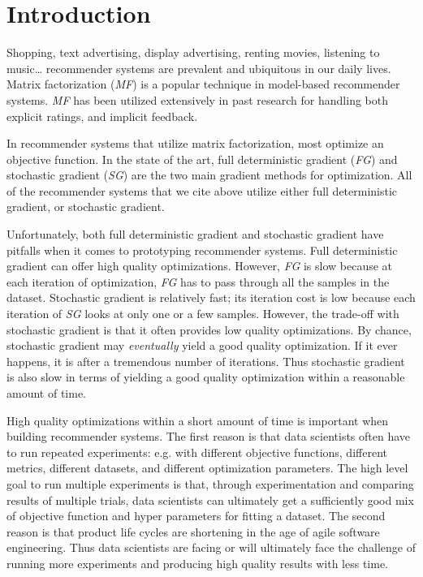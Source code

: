 \section{Introduction}
Shopping, text advertising, display advertising, renting movies, listening to music… recommender systems are prevalent and ubiquitous in our daily lives.  
Matrix factorization (\emph{MF}) is a popular technique in model-based recommender systems.  
\emph{MF} has been utilized extensively in past research for handling both explicit \cite{mmmf2005fast, mnar, gapfm} ratings, and implicit \cite{wrmf2008hu, wrmf2008pan, climf, bpr, mnar} feedback.  

In recommender systems that utilize matrix factorization, most optimize an objective function.  
In the state of the art, full deterministic gradient (\emph{FG}) and stochastic gradient (\emph{SG}) are the two main gradient methods for optimization.  
All of the recommender systems that we cite above utilize either full deterministic gradient, or stochastic gradient.

Unfortunately, both full deterministic gradient and stochastic gradient have pitfalls when it comes to prototyping recommender systems.  
Full deterministic gradient can offer high quality optimizations.  
However, \emph{FG} is slow because at each iteration of optimization, \emph{FG} has to pass through all the samples in the dataset.  
Stochastic gradient is relatively fast; its iteration cost is low because each iteration of \emph{SG} looks at only one or a few samples.  
However, the trade-off with stochastic gradient is that it often provides low quality optimizations.  
By chance, stochastic gradient may \emph{eventually} yield a good quality optimization. 
If it ever happens, it is after a tremendous number of iterations.  
Thus stochastic gradient is also slow in terms of yielding a good quality optimization within a reasonable amount of time.

High quality optimizations within a short amount of time is important when building recommender systems.  
The first reason is that data scientists often have to run repeated experiments: e.g. with different objective functions, different metrics, different datasets, and different optimization parameters.  
The high level goal to run multiple experiments is that, through experimentation and comparing results of multiple trials, 
data scientists can ultimately get a sufficiently good mix of objective function and hyper parameters for fitting a dataset.  
The second reason is that product life cycles are shortening in the age of agile software engineering.  
Thus data scientists are facing or will ultimately face the challenge of running more experiments and producing high quality results with less time.  

